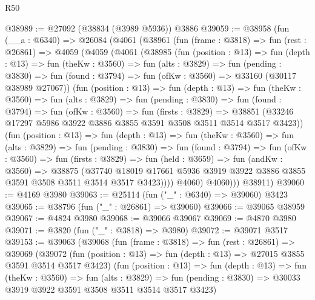 \begin{lexlean}{R50}
\begin{coremodule}
@38989 := @27092 (@38834 (@3989 @5936)) @3886
@39059 := @38958
    (fun (__a : @6340) =>
    @26084
      (@4061
        (@38961
          (fun (frame : @3818) =>
          fun (rest : @26861) =>
          @4059
            (@4059
              (@4061
                (@38985
                  (fun (position : @13) =>
                  fun (depth : @13) =>
                  fun (theKw : @3560) =>
                  fun (alts : @3829) =>
                  fun (pending : @3830) =>
                  fun (found : @3794) => fun (ofKw : @3560) => @33160 (@30117 @38989 @27067))
                  (fun (position : @13) =>
                  fun (depth : @13) =>
                  fun (theKw : @3560) =>
                  fun (alts : @3829) =>
                  fun (pending : @3830) =>
                  fun (found : @3794) =>
                  fun (ofKw : @3560) =>
                  fun (firsts : @3829) =>
                  @38851
                    (@33246 @17297 @5986 @3922 @3886 @3855 @3591 @3508 @3511 @3514 @3517 @3423))
                  (fun (position : @13) =>
                  fun (depth : @13) =>
                  fun (theKw : @3560) =>
                  fun (alts : @3829) =>
                  fun (pending : @3830) =>
                  fun (found : @3794) =>
                  fun (ofKw : @3560) =>
                  fun (firsts : @3829) =>
                  fun (held : @3659) =>
                  fun (andKw : @3560) =>
                  @38875
                    (@37740
                      @18019
                      @17661
                      @5936
                      @3919
                      @3922
                      @3886
                      @3855
                      @3591
                      @3508
                      @3511
                      @3514
                      @3517
                      @3423))))
              @4060)
            @4060)))
      @38911)
@39060 := @4169 @3980
@39063 := @25114 (fun ("_" : @6340) => @39060) @3423
@39065 := @38796 (fun ("_" : @26861) => @39060)
@39066 := @39065 @38959
@39067 := @4824 @3980
@39068 := @39066 @39067
@39069 := @4870 @3980
@39071 := @3820 (fun ("_" : @3818) => @3980)
@39072 := @39071 @3517
@39153 := @39063
    (@39068
      (fun (frame : @3818) =>
      fun (rest : @26861) =>
      @39069
        (@39072
          (fun (position : @13) => fun (depth : @13) => @27015 @3855 @3591 @3514 @3517 @3423)
          (fun (position : @13) =>
          fun (depth : @13) =>
          fun (theKw : @3560) =>
          fun (alts : @3829) =>
          fun (pending : @3830) => @30033 @3919 @3922 @3591 @3508 @3511 @3514 @3517 @3423)

\end{coremodule}
\end{lexlean}
